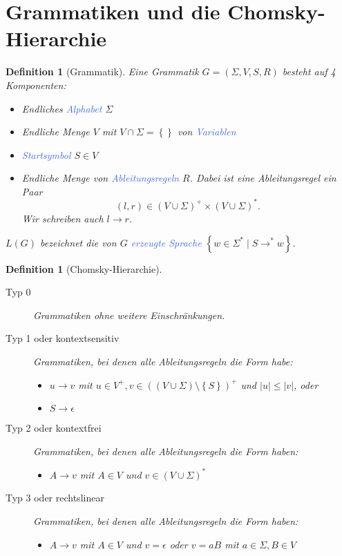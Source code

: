 \documentclass[11pt]{article}
\newcommand{\tcol}[1]{\textcolor{RoyalBlue}{#1}}
\newcommand{\set}[1]{\left\lbrace #1\right\rbrace}
\theoremstyle{break}
\newtheorem{defi}[satz]{Definition}
\begin{document}
\section{Grammatiken und die Chomsky-Hierarchie}


\begin{defi}[Grammatik]
Eine Grammatik $G=(\Sigma,V,S,R)$ besteht auf 4 Komponenten:
\begin{itemize}
\item Endliches \tcol{Alphabet} $\Sigma$
\item Endliche Menge $V$ mit $V\cap\Sigma=\set{}$ von \tcol{Variablen}
\item \tcol{Startsymbol} $S\in V$
\item Endliche Menge von \tcol{Ableitungsregeln} $R$. Dabei ist eine Ableitungsregel ein Paar 
\[(l,r)\in(V\cup\Sigma)^+\times(V\cup\Sigma)^*.\]
Wir schreiben auch $l\rightarrow r$.
\end{itemize}
$L(G)$ bezeichnet die von $G$ \tcol{erzeugte Sprache} $\set{w\in\Sigma^*\mid S\rightarrow^*w}$.
\end{defi}

\begin{defi}[Chomsky-Hierarchie]
\begin{description}
\item[Typ 0] Grammatiken ohne weitere Einschränkungen.
\item[Typ 1 oder kontextsensitiv] Grammatiken, bei denen alle Ableitungsregeln die Form habe:
	\begin{itemize}
	\item $u\rightarrow v$ mit $u\in V^+,v\in((V\cup\Sigma)\setminus\set{S})^+$ und $|u|\leq |v|$, oder
	\item $S\rightarrow\epsilon$
	\end{itemize}
\item[Typ 2 oder kontextfrei] Grammatiken, bei denen alle Ableitungsregeln die Form haben:
	\begin{itemize}
	\item $A\rightarrow v$ mit $A\in V$ und $v\in(V\cup\Sigma)^*$
	\end{itemize}
\item[Typ 3 oder rechtslinear] Grammatiken, bei denen alle Ableitungsregeln die Form haben:
	\begin{itemize}
	\item $A\rightarrow v$ mit $A\in V$ und $v=\epsilon$ oder $v=aB$ mit $a\in\Sigma,B\in V$
	\end{itemize}
\end{description}
\end{defi}
\end{document}
